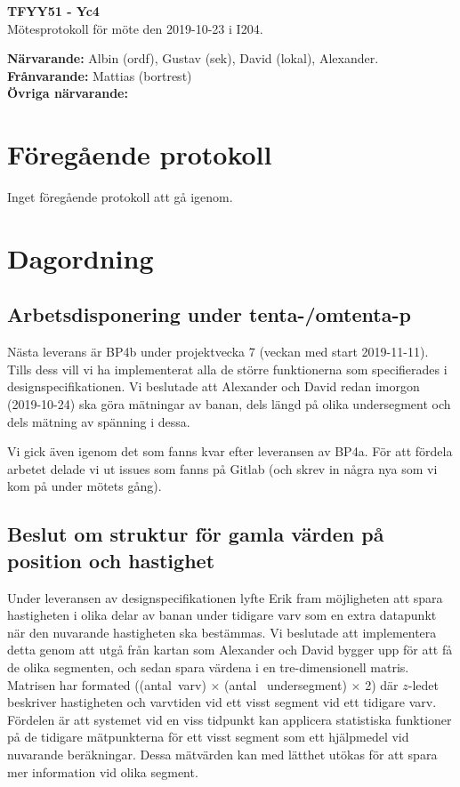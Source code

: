 \documentclass[11pt,a4paper]{article}
\begin{document}
    \begin{center}
        \textbf{\Large TFYY51 - Yc4} \\[0.2em]
        Mötesprotokoll för möte den 2019-10-23 i I204.
    \end{center}
    \vspace{1em}
    \textbf{Närvarande:} 
	Albin (ordf),
	Gustav (sek), 
	David (lokal), 
	Alexander.
	\\[0.5em]
	\textbf{Frånvarande:} Mattias (bortrest) \\[0.5em]
    \textbf{Övriga närvarande:}

    \section*{Föregående protokoll}
	Inget föregående protokoll att gå igenom.

    \section*{Dagordning}
    \subsection*{Arbetsdisponering under tenta-/omtenta-p}
	Nästa leverans är BP4b under projektvecka 7 (veckan med start 2019-11-11).
	Tills dess vill vi ha implementerat alla de större funktionerna som
	specifierades i designspecifikationen. Vi beslutade att Alexander och David
	redan imorgon (2019-10-24) ska göra mätningar av banan, dels längd på olika
	undersegment och dels mätning av spänning i dessa.

	Vi gick även igenom det som fanns kvar efter leveransen av BP4a. För att
	fördela arbetet delade vi ut issues som fanns på Gitlab (och skrev in några
	nya som vi kom på under mötets gång).

	\subsection*{Beslut om struktur för gamla värden på position och hastighet}

	Under leveransen av designspecifikationen lyfte Erik fram möjligheten att
	spara hastigheten i olika delar av banan under tidigare varv som en extra
	datapunkt när den nuvarande hastigheten ska bestämmas. Vi beslutade att
	implementera detta genom att utgå från kartan som Alexander och David bygger
	upp för att få de olika segmenten, och sedan spara värdena i en
	tre-dimensionell matris. Matrisen har formated ((antal~varv) $\times$ (antal~
	undersegment) $\times$ 2) där $z$-ledet beskriver hastigheten och varvtiden
	vid ett visst segment vid ett tidigare varv. Fördelen är att systemet vid en
	viss tidpunkt kan applicera statistiska funktioner på de tidigare
	mätpunkterna för ett visst segment som ett hjälpmedel vid nuvarande
	beräkningar. Dessa mätvärden kan med lätthet utökas för att spara mer
	information vid olika segment.
\end{document}
